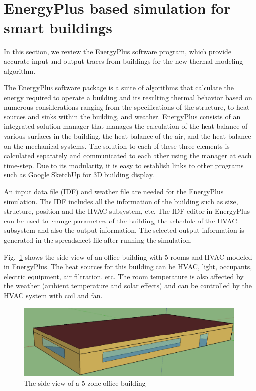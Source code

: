 \section{EnergyPlus based simulation for smart buildings}
\label{sec:energy_plus_review}
In this section, we review the EnergyPlus software program, which provide
accurate input and output traces from buildings for the new thermal
modeling algorithm.

The EnergyPlus software package is a suite of
algorithms that calculate the energy required to operate a building
and its resulting thermal behavior based on numerous considerations
ranging from the specifications of the structure, to heat sources and
sinks within the building, and weather. EnergyPlus consists of an integrated solution
manager that manages the calculation of the heat balance of various
surfaces in the building, the heat balance of the air, and the heat
balance on the mechanical systems. The solution to each of these three
elements is calculated separately and communicated to each other
using the manager at each time-step. Due to its modularity, it is easy to establish links to other programs such as Google SketchUp for 3D building display.

An input data file (IDF) and weather file are needed for the EnergyPlus
simulation. The IDF includes all the information of the building such
as size, structure, position and the HVAC subsystem, etc. The IDF
editor in EnergyPlus can be used to change parameters of the building, the
schedule of the HVAC subsystem and also the output information. The
selected output information is generated in the spreadsheet file
after running the simulation.

Fig.~\ref{fig:5zone} shows the side view of an office building
with 5 rooms and HVAC modeled in EnergyPlus. The heat sources for this building
can be HVAC, light, occupants, electric equipment, air filtration, etc. The
room temperature is also affected by the weather (ambient temperature and solar
effects) and can be controlled by the HVAC system with coil
and fan.

\begin{figure}[t]
    \centering
    \includegraphics[width=0.7\columnwidth]{figs/energyplus_review/5zone-a}
    \caption{The side view of a 5-zone office building}
    \label{fig:5zone}
\end{figure}

